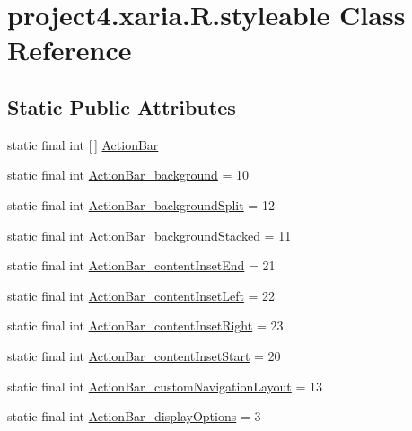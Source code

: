 \hypertarget{classproject4_1_1xaria_1_1R_1_1styleable}{}\section{project4.\+xaria.\+R.\+styleable Class Reference}
\label{classproject4_1_1xaria_1_1R_1_1styleable}
\subsection*{Static Public Attributes}
\begin{DoxyCompactItemize}
\item 
static final int \mbox{[}$\,$\mbox{]} \hyperlink{classproject4_1_1xaria_1_1R_1_1styleable_accb530194c58ee3abb15587da8869e99}{Action\+Bar}
\item 
static final int \hyperlink{classproject4_1_1xaria_1_1R_1_1styleable_ad5297d7335b655c3a7281371b07c92d4}{Action\+Bar\+\_\+background} = 10
\item 
static final int \hyperlink{classproject4_1_1xaria_1_1R_1_1styleable_a0a05b0d40453638b3b59df9b162097ec}{Action\+Bar\+\_\+background\+Split} = 12
\item 
static final int \hyperlink{classproject4_1_1xaria_1_1R_1_1styleable_aff562ad353237ec535896356fc27af79}{Action\+Bar\+\_\+background\+Stacked} = 11
\item 
static final int \hyperlink{classproject4_1_1xaria_1_1R_1_1styleable_a89330126d297ac16f0e2a9dcfeaad358}{Action\+Bar\+\_\+content\+Inset\+End} = 21
\item 
static final int \hyperlink{classproject4_1_1xaria_1_1R_1_1styleable_a1b56e7090c35d8a347e0df70c0835624}{Action\+Bar\+\_\+content\+Inset\+Left} = 22
\item 
static final int \hyperlink{classproject4_1_1xaria_1_1R_1_1styleable_a214d077d9e00a3988b431a70cd90e71e}{Action\+Bar\+\_\+content\+Inset\+Right} = 23
\item 
static final int \hyperlink{classproject4_1_1xaria_1_1R_1_1styleable_a9212bf97d9d5252fd23d430335413682}{Action\+Bar\+\_\+content\+Inset\+Start} = 20
\item 
static final int \hyperlink{classproject4_1_1xaria_1_1R_1_1styleable_aa80da3fcac263c12efd759fb11979cc7}{Action\+Bar\+\_\+custom\+Navigation\+Layout} = 13
\item 
static final int \hyperlink{classproject4_1_1xaria_1_1R_1_1styleable_a656add89aebf98d754b0482202026647}{Action\+Bar\+\_\+display\+Options} = 3
\item 

\end{DoxyCompactItemize}
